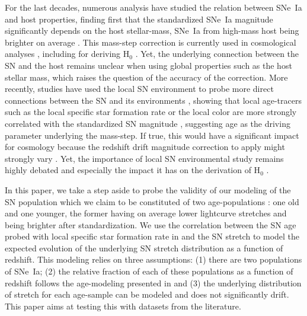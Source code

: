 \documentclass[]{aa} %
\begin{document}
For the last decades, numerous analysis have studied the relation between SNe~Ia
and host properties, finding first that the standardized SNe~Ia magnitude
significantly depends on the host stellar-mass, SNe~Ia from high-mass host being
brighter on average \cite[e.g.][]{kelly2010, sullivan2010, childress2013,
betoule2014, rigault2018, kim19}.  This mass-step correction is currently used
in cosmological analyses \citep[e.g.][]{betoule2014, scolnic2018a}, including
for deriving H$_0$ \citep{riess2016, riess2019}. Yet, the underlying connection
between the SN and the host remains unclear when using global properties such as
the host stellar mass, which raises the question of the accuracy of the
correction. More recently, studies have used the local SN environment to probe
more direct connections between the SN and its environments \citep{rigault2013},
showing that local age-tracers such as the local specific star formation rate or
the local color are more strongly correlated with the standardized SN magnitude
\citep{rigault2018, roman2018, kim18}, suggesting age as the driving parameter
underlying the mass-step. If true, this would have a significant impact for
cosmology because the redshift drift magnitude correction to apply might
strongly vary \citep{rigault2013,childress2014,scolnic2018a}.  Yet, the
importance of local SN environmental study remains highly debated
\cite[e.g.][]{jones2015,jones2019} and especially the impact it has on the
derivation of H$_0$ \citep{jones2015,riess2016,riess2018,rose2019}.

In this paper, we take a step aside to probe the validity of our modeling of the
SN population which we claim to be constituted of two age-populations
\citep{rigault2013,rigault2015,rigault2018}: one old and one younger, the former
having on average lower lightcurve stretches and being brighter after
standardization. We use the correlation between the SN age probed with local
specific star formation rate in \cite{rigault2018} and the SN stretch to model
the expected evolution of the underlying SN stretch distribution as a function
of redshift. This modeling relies on three assumptions: (1) there are two
populations of SNe~Ia; (2) the relative fraction of each of these populations as
a function of redshift follows the age-modeling presented in \cite{rigault2018}
and (3) the underlying distribution of stretch for each age-sample can be
modeled and does not significantly drift. This paper aims at testing this with
datasets from the literature.
\end{document}
